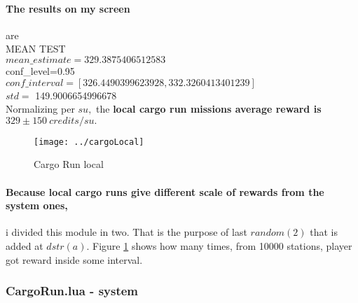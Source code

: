 \documentclass[]{article}
\begin{document}
\paragraph*{The results on my screen} are\\
MEAN TEST\\
$mean\_estimate=329.3875406512583$\\
conf\_level=0.95\\
$conf\_interval=[326.4490399623928,332.3260413401239]$\\
$std=$ 149.9006654996678\\
Normalizing per $su,$ the \textbf{local cargo run missions average reward is $329\pm150\ credits/su.$}
\begin{figure}[h]
	\centering
	\texttt{[image: ../cargoLocal]}
	\caption{Cargo Run local}
	\label{fig:cargolocal}
\end{figure}
\paragraph*{Because local cargo runs give different scale of rewards from the system ones,} i divided this module in two. That is the purpose of last $random(2)$ that is added at $dstr(a).$
Figure \ref{fig:cargolocal} shows how many times, from 10000 stations, player got reward inside some interval.\\ 

\subsubsection{CargoRun.lua - system}
\end{document}
